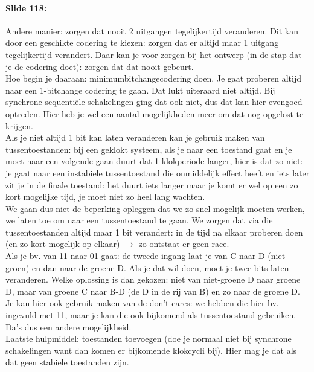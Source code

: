 \documentclass[10pt,a4paper]{book}
\begin{document}
\paragraph{Slide 118:} Andere manier: zorgen dat nooit 2 uitgangen tegelijkertijd veranderen. Dit kan door een geschikte codering te kiezen: zorgen dat er altijd maar 1 uitgang tegelijkertijd verandert. Daar kan je voor zorgen bij het ontwerp (in de stap dat je de codering doet): zorgen dat dat nooit gebeurt.\\
Hoe begin je daaraan: minimumbitchangecodering doen. Je gaat proberen altijd naar een 1-bitchange codering te gaan. Dat lukt uiteraard niet altijd. Bij synchrone sequenti\"ele schakelingen ging dat ook niet, dus dat kan hier evengoed optreden. Hier heb je wel een aantal mogelijkheden meer om dat nog opgelost te krijgen.\\
Als je niet altijd 1 bit kan laten veranderen kan je gebruik maken van tussentoestanden: bij een geklokt systeem, als je naar een toestand gaat en je moet naar een volgende gaan duurt dat 1 klokperiode langer, hier is dat zo niet: je gaat naar een instabiele tussentoestand die onmiddelijk effect heeft en iets later zit je in de finale toestand: het duurt iets langer maar je komt er wel op een zo kort mogelijke tijd, je moet niet zo heel lang wachten.\\
We gaan dus niet de beperking opleggen dat we zo snel mogelijk moeten werken, we laten toe om naar een tussentoestand te gaan. We zorgen dat via die tussentoestanden altijd maar 1 bit verandert: in de tijd na elkaar proberen doen (en zo kort mogelijk op elkaar) $\rightarrow$ zo ontstaat er geen race.\\
Als je bv. van 11 naar 01 gaat: de tweede ingang laat je van C naar D (niet-groen) en dan naar de groene D. Als je dat wil doen, moet je twee bits laten veranderen. Welke oplossing is dan gekozen: niet van niet-groene D naar groene D, maar van groene C naar B-D (de D in de rij van B) en zo naar de groene D.\\
Je kan hier ook gebruik maken van de don't cares: we hebben die hier bv. ingevuld met 11, maar je kan die ook bijkomend als tussentoestand gebruiken. Da's dus een andere mogelijkheid.\\
Laatste hulpmiddel: toestanden toevoegen (doe je normaal niet bij synchrone schakelingen want dan komen er bijkomende klokcycli bij). Hier mag je dat als dat geen stabiele toestanden zijn. 
\end{document}
